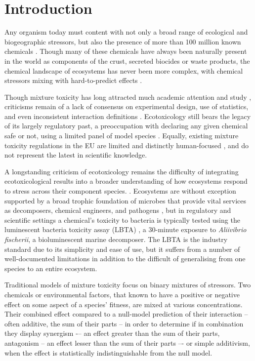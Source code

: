 \documentclass[final,1p,times]{elsarticle}
\begin{document}
\linenumbers

\section{Introduction}
\label{S:1}

Any organism today must content with not only a broad range of ecological and biogeographic stressors, but also the presence of more than 100 million known chemicals \cite{CAS2015}. Though many of these chemicals have always been naturally present in the world as components of the crust, secreted biocides or waste products, the chemical landscape of ecosystems has never been more complex, with chemical stressors mixing with hard-to-predict effects \cite{EuropeanCommission2012a}. 

Though mixture toxicity has long attracted much academic attention and study \cite{Bliss1939}, criticisms remain of a lack of consensus on experimental design, use of statistics, and even inconsistent interaction definitions \cite{Jackson2016,Piggott2015,Schafer2018}. Ecotoxicology still bears the legacy of its largely regulatory past, a preoccupation with declaring any given chemical safe or not, using a limited panel of model species \cite{OECD2014SectionSystems}. Equally, existing mixture toxicity regulations in the EU are limited and distinctly human-focused \cite{EuropeanCommission2012a}, and do not represent the latest in scientific knowledge.

A longstanding criticism of ecotoxicology remains the difficulty of integrating ecotoxicological results into a broader understanding of how ecosystems respond to stress across their component species. \cite{Chapman2002a,Gessner2016}. Ecosystems are without exception supported by a broad trophic foundation of microbes that provide vital services as decomposers, chemical engineers, and pathogens \cite{Nannipieri2003a,VanderHeijden2008a}, but in regulatory and scientific settings a chemical's toxicity to bacteria is typically tested using the luminescent bacteria toxicity assay (LBTA) \cite{OECD2014SectionSystems}, a 30-minute exposure to \textit{Aliivibrio fischerii}, a bioluminescent marine decomposer. The LBTA is the industry standard due to its simplicity and ease of use, but it suffers from a number of well-documented limitations \cite{Ma2014} in addition to the difficult of generalising from one species to an entire ecosystem.

Traditional models of mixture toxicity focus on binary mixtures of stressors. Two chemicals or environmental factors, that known to have a positive or negative effect on some aspect of a species' fitness, are mixed at various concentrations. Their combined effect compared to a null-model prediction of their interaction -- often additive, the sum of their parts -- in order to determine if in combination they display synergism -– an effect greater than the sum of their parts, antagonism – an effect lesser than the sum of their parts –- or simple additivism, when the effect is statistically indistinguishable from the null model. 
\end{document}
